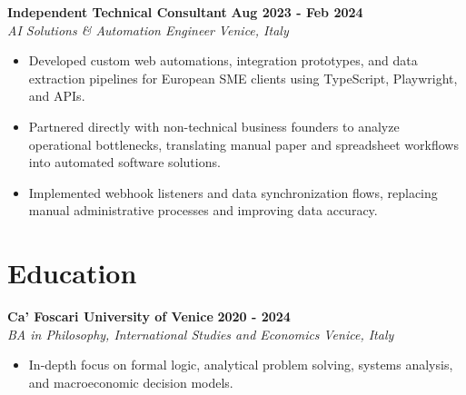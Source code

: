 \documentclass[10pt,a4paper]{article}
\newcommand{\role}[4]{%
  \textbf{#1} \hfill \textbf{#2}\\[1pt]%
  \textit{#3} \hfill \textit{#4}\\[2pt]%
}
\begin{document}
\role{Independent Technical Consultant}{Aug 2023 - Feb 2024}{AI Solutions \& Automation Engineer}{Venice, Italy}
\begin{itemize}
  \item Developed custom web automations, integration prototypes, and data extraction pipelines for European SME clients using TypeScript, Playwright, and APIs.
  \item Partnered directly with non-technical business founders to analyze operational bottlenecks, translating manual paper and spreadsheet workflows into automated software solutions.
  \item Implemented webhook listeners and data synchronization flows, replacing manual administrative processes and improving data accuracy.
\end{itemize}

\section{Education}
\role{Ca' Foscari University of Venice}{2020 - 2024}{BA in Philosophy, International Studies and Economics}{Venice, Italy}
\begin{itemize}
  \item In-depth focus on formal logic, analytical problem solving, systems analysis, and macroeconomic decision models.
\end{itemize}
\end{document}

